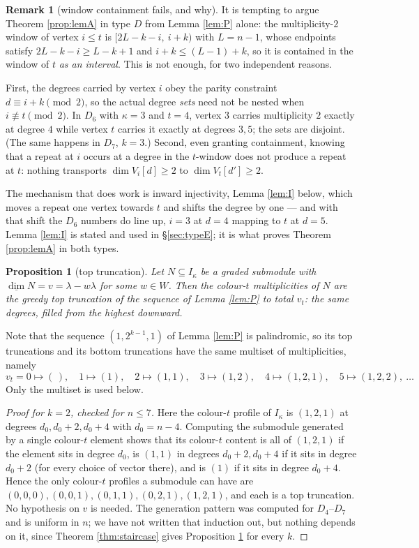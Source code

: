 \documentclass[11pt,reqno]{amsart}
\theoremstyle{plain}
\newtheorem{proposition}[theorem]{Proposition}
\theoremstyle{definition}
\newtheorem{remark}[theorem]{Remark}
\newcommand{\dimv}{\underline{\dim}}
\newcommand{\la}{\lambda}
\newcommand{\ka}{\kappa}
\begin{document}
\begin{remark}[window containment fails, and why]\label{rem:nowindow}
It is tempting to argue Theorem \ref{prop:lemA} in type $D$ from Lemma
\ref{lem:P} alone: the multiplicity-$2$ window of vertex $i\le t$ is
$[2L-k-i,\ i+k)$ with $L=n-1$, whose endpoints satisfy $2L-k-i\ge L-k+1$ and
$i+k\le (L-1)+k$, so it is contained in the window of $t$ \emph{as an
interval}.  This is not enough, for two independent reasons.

First, the degrees carried by vertex $i$ obey the parity constraint
$d\equiv i+k\pmod2$, so the actual degree \emph{sets} need not be nested when
$i\not\equiv t\pmod 2$.  In $D_6$ with $\ka=3$ and $t=4$, vertex $3$ carries
multiplicity $2$ exactly at degree $4$ while vertex $t$ carries it exactly at
degrees $3,5$; the sets are disjoint.  (The same happens in $D_7$, $k=3$.)
Second, even granting containment, knowing that a repeat at $i$ occurs at a
degree in the $t$-window does not produce a repeat at $t$: nothing transports
$\dim V_i[d]\ge2$ to $\dim V_t[d']\ge2$.

The mechanism that does work is inward injectivity, Lemma \ref{lem:I} below,
which moves a repeat one vertex towards $t$ and shifts the degree by one --- and
with that shift the $D_6$ numbers do line up, $i=3$ at $d=4$ mapping to $t$ at
$d=5$.  Lemma \ref{lem:I} is stated and used in \S\ref{sec:typeE}; it is what
proves Theorem \ref{prop:lemA} in both types.
\end{remark}

\begin{proposition}[top truncation]\label{prop:T}
Let $N\subseteq I_\ka$ be a graded submodule with $\dimv N=v=\la-w\la$ for
some $w\in W$.  Then the colour-$t$ multiplicities of $N$ are the greedy
\emph{top} truncation of the sequence of Lemma \ref{lem:P} to total $v_t$:
the same degrees, filled from the highest downward.
\end{proposition}

Note that the sequence $(1,2^{k-1},1)$ of Lemma \ref{lem:P} is palindromic, so
its top truncations and its bottom truncations have the same multiset of
multiplicities, namely
\[
 v_t=0\mapsto(\,),\quad 1\mapsto(1),\quad 2\mapsto(1,1),\quad 3\mapsto(1,2),
 \quad 4\mapsto(1,2,1),\quad 5\mapsto(1,2,2),\ \dots
\]
Only the multiset is used below.

\begin{proof}[Proof for $k=2$, checked for $n\le7$]
Here the colour-$t$ profile of $I_\ka$ is $(1,2,1)$ at degrees $d_0,d_0+2,
d_0+4$ with $d_0=n-4$.  Computing the submodule generated by a single
colour-$t$ element shows that its colour-$t$ content is all of $(1,2,1)$ if the
element sits in degree $d_0$, is $(1,1)$ in degrees $d_0+2,d_0+4$ if it sits in
degree $d_0+2$ (for every choice of vector there), and is $(1)$ if it sits in
degree $d_0+4$.  Hence the only colour-$t$ profiles a submodule can have are
$(0,0,0),(0,0,1),(0,1,1),(0,2,1),(1,2,1)$, and each is a top truncation.  No
hypothesis on $v$ is needed.  The generation pattern was computed for
$D_4$--$D_7$ and is uniform in $n$; we have not written that induction out, but
nothing depends on it, since Theorem \ref{thm:staircase} gives Proposition
\ref{prop:T} for every $k$.
\end{proof}
\end{document}
